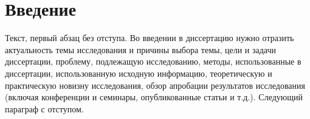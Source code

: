\chapter*{Введение}                         %
\noindent Текст, первый абзац без отступа. Во введении в диссертацию нужно отразить актуальность темы исследования и причины выбора темы, цели и задачи диссертации, проблему, подлежащую исследованию, методы, использованные в диссертации, использованную исходную информацию, теоретическую и практическую новизну исследования, обзор апробации результатов исследования (включая конференции и семинары, опубликованные статьи и т.д.).
Следующий параграф с отступом.
